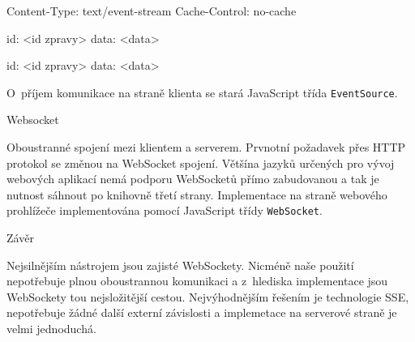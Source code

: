 \begtt
Content-Type: text/event-stream
Cache-Control: no-cache

id: <id zpravy>
data: <data>

id: <id zpravy>
data: <data>
\endtt

\noindent
O~příjem komunikace na straně klienta se stará JavaScript třída {\tt EventSource}.

\secc Websocket

Oboustranné spojení mezi klientem a serverem.
Prvnotní požadavek přes HTTP protokol se změnou na WebSocket spojení.
Většína jazyků určených pro vývoj webových aplikací nemá podporu WebSocketů přímo zabudovanou a tak je nutnost sáhnout po knihovně třetí strany.
Implementace na straně webového prohlížeče implementována pomocí JavaScript třídy {\tt WebSocket}.

\secc Závěr

Nejsilnějším nástrojem jsou zajisté WebSockety.
Nicméně naše použití nepotřebuje plnou oboustrannou komunikaci a z~hlediska implementace jsou WebSockety tou nejsložitější cestou.
Nejvýhodnějším řešením je technologie SSE, nepotřebuje žádné další externí závislosti a implemetace na serverové straně je velmi jednoduchá.